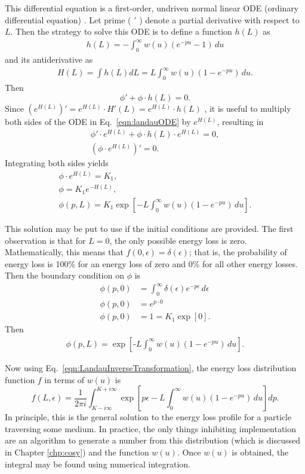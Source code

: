 This differential equation is a first-order, undriven normal linear ODE (ordinary differential equation) \cite{Borrelli}. Let prime ( $'$ ) denote a partial derivative with respect to $L$. Then the strategy to solve this ODE is to define a function $h(L)$ as
%
\begin{gather*}
h(L)=-\int_0 ^\infty w(u)  (e^{-pu}-1)\, du
\end{gather*}
and its antiderivative as
\begin{gather*}
H(L)=\int h(L) dL=L \int_0 ^\infty w(u)  (1-e^{-pu})\, du.
\end{gather*}
Then
\begin{equation}\label{eqn:landauODE}
\phi ' + \phi \cdot h(L) = 0.
\end{equation}
%
Since $(e^{H(L)}) ' = e^{H(L)}\cdot H'(L)= e^{H(L)}\cdot h(L)$ , it is useful to multiply both sides of the ODE in Eq.~\eqref{eqn:landauODE} by $e^{H(L)}$, resulting in
\begin{gather*}
\phi ' \cdot e^{H(L)}+ \phi \cdot h(L) \cdot e^{H(L)} = 0,\\
(\phi\cdot e^{H(L)}) ' = 0.
\end{gather*}
Integrating both sides yields
\begin{gather*}
\phi\cdot e^{H(L)}=K_1,\\
\phi = K_1 e^{-H(L)},\\
\phi(p,L)=K_1 \exp\left[-L\int_0 ^\infty w(u)  (1-e^{-pu})\, du\right].
\end{gather*}

This solution may be put to use if the initial conditions are provided. The first observation is that for $L=0$, the only possible energy loss is zero. Mathematically, this means that $f(0,\epsilon)=\delta(\epsilon)$; that is, the probability of energy loss is 100\% for an energy loss of zero and 0\% for all other energy losses. Then the boundary condition on $\phi$ is
\begin{align}
\phi(p,0)&=\int_0 ^\infty \delta(\epsilon) e^{-p\epsilon}\, d\epsilon\nonumber\\
\phi(p,0)&=e^{p\cdot 0}\nonumber\\
\phi(p,0)&=1=K_1\exp[0].\nonumber%
\end{align}
Then
\begin{gather*}
\phi(p,L)=\exp\left[\textrm{-}L\int_0 ^\infty w(u)  (1-e^{-pu})\, du\right].
\end{gather*}

Now using Eq.~\eqref{eqn:LandauInverseTransformation}, the energy loss distribution function $f$ in terms of $w(u)$ is 
\begin{equation} \label{eqn:LandauGeneralSolution}
f(L,\epsilon)=\frac{1}{2\pi i} \int_{K-i\infty} ^{K+i\infty} \exp\left[p\epsilon-L\int_0 ^\infty w(u)  (1-e^{-pu})\, du\right] dp.
\end{equation}
In principle, this is the general solution to the energy loss profile for a particle traversing some medium. In practice, the only things inhibiting implementation are an algorithm to generate a number from this distribution (which is discussed in Chapter \ref{chp:cosy}) and the function $w(u)$. Once $w(u)$ is obtained, the integral may be found using numerical integration.

